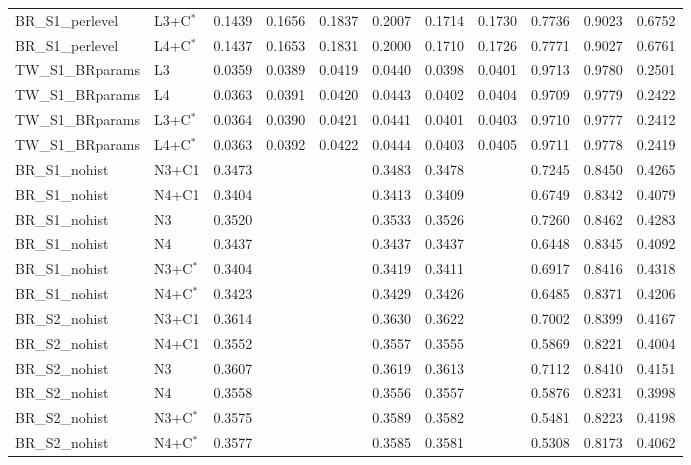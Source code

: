 \begin{tabular}{llrrrrrrrrr}
BR\_S1\_perlevel & L3+C$^{*}$ & 0.1439 & 0.1656 & 0.1837 & 0.2007 & 0.1714 & 0.1730 & 0.7736 & 0.9023 & 0.6752 \\
BR\_S1\_perlevel & L4+C$^{*}$ & 0.1437 & 0.1653 & 0.1831 & 0.2000 & 0.1710 & 0.1726 & 0.7771 & 0.9027 & 0.6761 \\
TW\_S1\_BRparams & L3 & 0.0359 & 0.0389 & 0.0419 & 0.0440 & 0.0398 & 0.0401 & 0.9713 & 0.9780 & 0.2501 \\
TW\_S1\_BRparams & L4 & 0.0363 & 0.0391 & 0.0420 & 0.0443 & 0.0402 & 0.0404 & 0.9709 & 0.9779 & 0.2422 \\
TW\_S1\_BRparams & L3+C$^{*}$ & 0.0364 & 0.0390 & 0.0421 & 0.0441 & 0.0401 & 0.0403 & 0.9710 & 0.9777 & 0.2412 \\
TW\_S1\_BRparams & L4+C$^{*}$ & 0.0363 & 0.0392 & 0.0422 & 0.0444 & 0.0403 & 0.0405 & 0.9711 & 0.9778 & 0.2419 \\
BR\_S1\_nohist & N3+C1 & 0.3473 &  &  & 0.3483 & 0.3478 &  & 0.7245 & 0.8450 & 0.4265 \\
BR\_S1\_nohist & N4+C1 & 0.3404 &  &  & 0.3413 & 0.3409 &  & 0.6749 & 0.8342 & 0.4079 \\
BR\_S1\_nohist & N3 & 0.3520 &  &  & 0.3533 & 0.3526 &  & 0.7260 & 0.8462 & 0.4283 \\
BR\_S1\_nohist & N4 & 0.3437 &  &  & 0.3437 & 0.3437 &  & 0.6448 & 0.8345 & 0.4092 \\
BR\_S1\_nohist & N3+C$^{*}$ & 0.3404 &  &  & 0.3419 & 0.3411 &  & 0.6917 & 0.8416 & 0.4318 \\
BR\_S1\_nohist & N4+C$^{*}$ & 0.3423 &  &  & 0.3429 & 0.3426 &  & 0.6485 & 0.8371 & 0.4206 \\
BR\_S2\_nohist & N3+C1 & 0.3614 &  &  & 0.3630 & 0.3622 &  & 0.7002 & 0.8399 & 0.4167 \\
BR\_S2\_nohist & N4+C1 & 0.3552 &  &  & 0.3557 & 0.3555 &  & 0.5869 & 0.8221 & 0.4004 \\
BR\_S2\_nohist & N3 & 0.3607 &  &  & 0.3619 & 0.3613 &  & 0.7112 & 0.8410 & 0.4151 \\
BR\_S2\_nohist & N4 & 0.3558 &  &  & 0.3556 & 0.3557 &  & 0.5876 & 0.8231 & 0.3998 \\
BR\_S2\_nohist & N3+C$^{*}$ & 0.3575 &  &  & 0.3589 & 0.3582 &  & 0.5481 & 0.8223 & 0.4198 \\
BR\_S2\_nohist & N4+C$^{*}$ & 0.3577 &  &  & 0.3585 & 0.3581 &  & 0.5308 & 0.8173 & 0.4062 \\
\bottomrule
\end{tabular}
